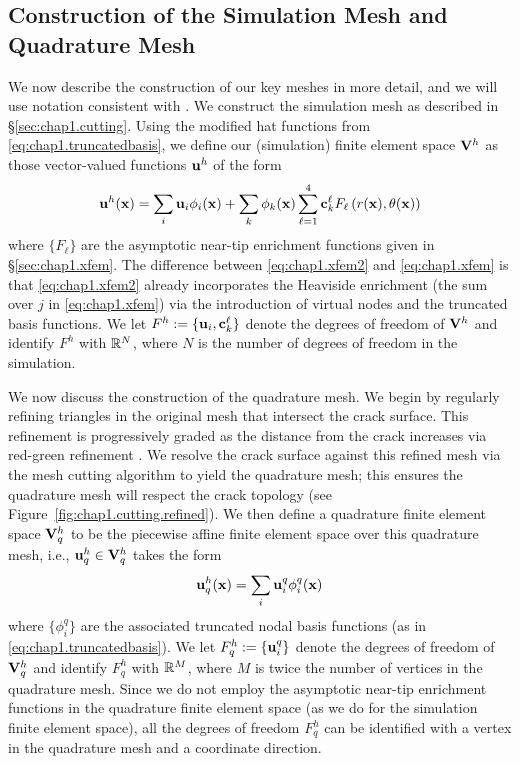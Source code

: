 \subsection{Construction of the Simulation Mesh and Quadrature Mesh}

We now describe the construction of our key meshes in more detail, and we will use notation consistent with \cite{Braess07}. We construct the simulation mesh as described in \S\ref{sec:chap1.cutting}. Using the modified hat functions from \eqref{eq:chap1.truncatedbasis}, we define our (simulation) finite element space $\mathbf{V}^h$ as those vector-valued functions $\mathbf{u}^h$ of the form
\begin{equation} \label{eq:chap1.xfem2}
\mathbf{u}^h(\mathbf{x}) = \sum_i \mathbf{u}_i \phi_i(\mathbf{x}) + \sum_k \phi_k(\mathbf{x}) \sum_{\ell = 1}^4 \mathbf{c}_k^{\ell} F_{\ell} \left( r(\mathbf{x}), \theta(\mathbf{x}) \right)
\end{equation}
where $\{F_{\ell}\}$ are the asymptotic near-tip enrichment functions given in \S\ref{sec:chap1.xfem}. The difference between \eqref{eq:chap1.xfem2} and \eqref{eq:chap1.xfem} is that \eqref{eq:chap1.xfem2} already incorporates the Heaviside enrichment (the sum over $j$ in \eqref{eq:chap1.xfem}) via the introduction of virtual nodes and the truncated basis functions. We let $F^h := \{\mathbf{u}_i, \mathbf{c}_k^{\ell}\}$ denote the degrees of freedom of $\mathbf{V}^h$ and identify $F^h$ with $\mathbb{R}^N$, where $N$ is the number of degrees of freedom in the simulation.

We now discuss the construction of the quadrature mesh. We begin by regularly refining triangles in the original mesh that intersect the crack surface. This refinement is progressively graded as the distance from the crack increases via red-green refinement \cite{Molino03}. We resolve the crack surface against this refined mesh via the mesh cutting algorithm to yield the quadrature mesh; this ensures the quadrature mesh will respect the crack topology (see Figure~\ref{fig:chap1.cutting.refined}). We then define a quadrature finite element space $\mathbf{V}_q^h$ to be the piecewise affine finite element space over this quadrature mesh, i.e., $\mathbf{u}_q^h \in \mathbf{V}_q^h$ takes the form
\begin{equation} \label{eq:chap1.xfem.refined}
\mathbf{u}_q^h(\mathbf{x}) = \sum_i \mathbf{u}^q_i \phi^q_i(\mathbf{x})
\end{equation}
where $\{\phi^q_i\}$ are the associated truncated nodal basis functions (as in \eqref{eq:chap1.truncatedbasis}). We let $F_q^h := \{\mathbf{u}^q_i\}$ denote the degrees of freedom of $\mathbf{V}_q^h$ and identify $F_q^h$ with $\mathbb{R}^M$, where $M$ is twice the number of vertices in the quadrature mesh. Since we do not employ the asymptotic near-tip enrichment functions in the quadrature finite element space (as we do for the simulation finite element space), all the degrees of freedom $F_q^h$ can be identified with a vertex in the quadrature mesh and a coordinate direction.

